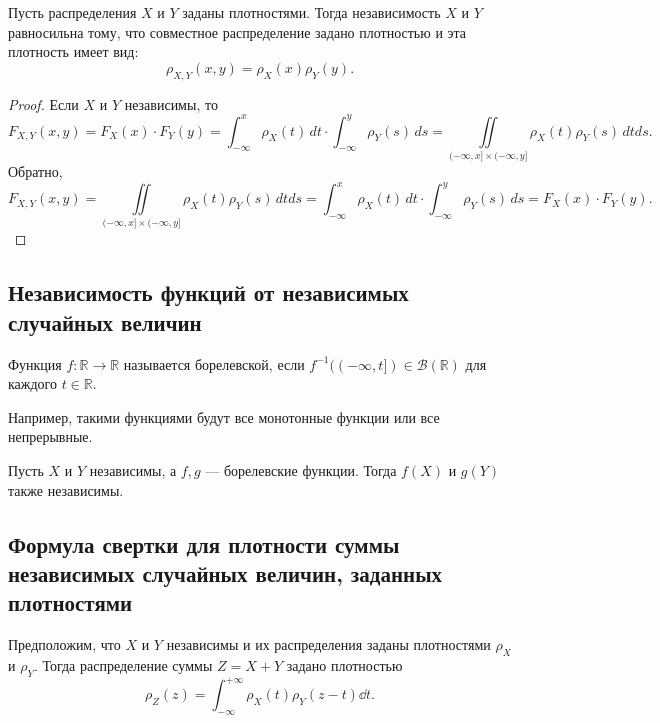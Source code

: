 \begin{proposal*}
    Пусть распределения $X$ и $Y$ заданы плотностями. Тогда независимость $X$ и $Y$ равносильна тому, что совместное распределение задано плотностью и эта плотность имеет вид:
    $$
    \rho_{X, Y}(x, y)=\rho_{X}(x)\rho_{Y}(y).
    $$
\end{proposal*}

\begin{proof}
    Если $X$ и $Y$ независимы, то
    $$
        F_{X, Y}(x,y)=F_X(x)\cdot F_Y(y)
        =\int_{-\infty}^x\rho_X(t)\, dt\cdot
        \int_{-\infty}^y\rho_Y(s)\, ds
        =
        \iint\limits_{(-\infty, x]\times(-\infty, y]}\rho_X(t)\rho_Y(s)\, dtds.
    $$
    Обратно,
    $$
        F_{X, Y}(x,y)=
        \iint\limits_{(-\infty, x]\times(-\infty, y]}\rho_X(t)\rho_Y(s)\, dtds
        =
        \int_{-\infty}^x\rho_X(t)\, dt\cdot
        \int_{-\infty}^y\rho_Y(s)\, ds
        =
        F_X(x)\cdot F_Y(y).
    $$
\end{proof}

\sectionbreak
\subsection{Независимость функций от независимых случайных величин}

\begin{definition*}
    Функция $f\colon \mathbb{R} \to \mathbb{R}$ называется борелевской, если $f^{-1}((-\infty, t])\in \mathcal{B}(\mathbb{R})$ для каждого $t\in \mathbb{R}$.
\end{definition*}

Например, такими функциями будут все монотонные функции или все непрерывные.

\begin{corollary*}
    Пусть $X$ и $Y$ независимы, а $f, g$ --- борелевские функции.
    Тогда $f(X)$ и $g(Y)$ также независимы.
\end{corollary*}

\sectionbreak
\subsection{Формула свертки для плотности суммы независимых случайных величин, заданных плотностями}

\begin{theorem*}
    Предположим, что $X$ и $Y$ независимы и их распределения заданы плотностями $\rho_X$ и $\rho_Y$. Тогда распределение суммы $Z = X + Y$ задано плотностью
    \[
        \rho_{Z}(z) = \int_{-\infty}^{+\infty} \rho_X(t) \rho_Y(z - t) \dd t.
    \]
\end{theorem*}

